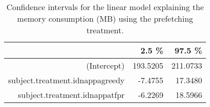 \begin{table}[ht]
\centering
\begin{tabular}{rrr}
  \hline
 & 2.5 \% & 97.5 \% \\ 
  \hline
(Intercept) & 193.5205 & 211.0733 \\ 
  subject.treatment.idnappagreedy & -7.4755 & 17.3480 \\ 
  subject.treatment.idnappatfpr & -6.2269 & 18.5966 \\ 
   \hline
\end{tabular}
\caption{Confidence intervals for the linear model explaining the memory consumption (MB) using the prefetching treatment.} 
\label{tab:hypothesis:memory:confint}
\end{table}
